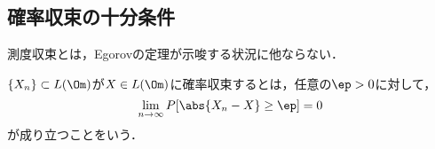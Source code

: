 \documentclass[uplatex,dvipdfmx]{jsreport}
\begin{document}
\subsection{確率収束の十分条件}

\begin{tcolorbox}[colframe=ForestGreen, colback=ForestGreen!10!white,breakable,colbacktitle=ForestGreen!40!white,coltitle=black,fonttitle=\bfseries\sffamily,
title=]
    測度収束とは，Egorovの定理が示唆する状況に他ならない．
\end{tcolorbox}

\begin{definition}
    $\{X_n\}\subset L(\Om)$が$X\in L(\Om)$に確率収束するとは，任意の$\ep>0$に対して，
    \[\lim_{n\to\infty}P[\abs{X_n-X}\ge\ep]=0\]
    が成り立つことをいう．
\end{definition}
\end{document}
